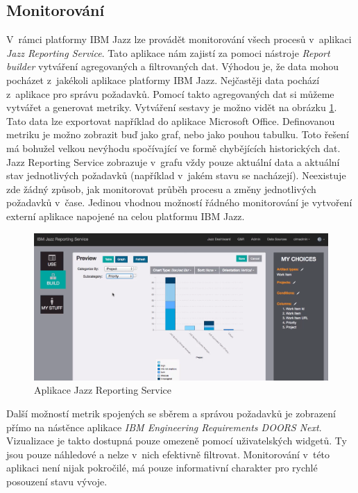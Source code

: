 \documentclass[czech,master]{diploma}
\begin{document}
\subsection{Monitorování}
V~rámci platformy IBM Jazz lze provádět monitorování všech procesů v~aplikaci \textit{Jazz Reporting Service}. Tato aplikace nám zajistí za pomoci nástroje \textit{Report builder} vytváření agregovaných a filtrovaných dat. Výhodou je, že data mohou pocházet z~jakékoli aplikace platformy IBM Jazz. Nejčastěji data pochází z~aplikace pro správu požadavků. Pomocí takto agregovaných dat si můžeme vytvářet a generovat metriky. Vytváření sestavy je možno vidět na obrázku \ref{fig:ibm_reporting_service}. Tato data lze exportovat například do aplikace Microsoft Office. Definovanou metriku je možno zobrazit buď jako graf, nebo jako pouhou tabulku. Toto řešení má bohužel velkou nevýhodu spočívající ve formě chybějících historických dat. Jazz Reporting Service zobrazuje v~grafu vždy pouze aktuální data a aktuální stav jednotlivých požadavků (například v~jakém stavu se nacházejí). Neexistuje zde žádný způsob, jak monitorovat průběh procesu a změny jednotlivých požadavků v~čase. Jedinou vhodnou možností řádného monitorování je vytvoření externí aplikace napojené na celou platformu IBM Jazz.

\begin{figure}[!ht]
    \centering
    \includegraphics[width=1\textwidth]{Diplomka/Figures/ibm_reporting_service.png}
    \caption{Aplikace Jazz Reporting Service}
    \label{fig:ibm_reporting_service}
\end{figure}

Další možností metrik spojených se sběrem a správou požadavků je zobrazení přímo na nástěnce aplikace \textit{IBM Engineering Requirements DOORS Next}. Vizualizace je takto dostupná pouze omezeně pomocí uživatelských widgetů. Ty jsou pouze náhledové a nelze v~nich efektivně filtrovat. Monitorování v~této aplikaci není nijak pokročilé, má pouze informativní charakter pro rychlé posouzení stavu vývoje.
\end{document}
